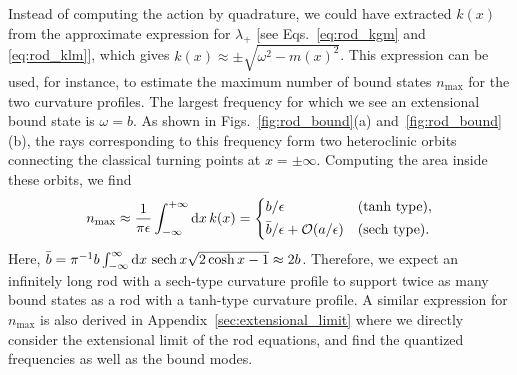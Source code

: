 Instead of computing the action by quadrature, we could have extracted $k(x)$ from the approximate expression for $\lambda_{+}$ [see Eqs.~\eqref{eq:rod_kgm} and \eqref{eq:rod_klm}], which gives $k(x) \approx \pm\sqrt{\omega^{2} - m(x)^{2}}$.
This expression can be used, for instance, to estimate the maximum number of bound states $n_{\text{max}}$ for the two curvature profiles.
The largest frequency for which we see an extensional bound state is $\omega = b$.
As shown in Figs.~\ref{fig:rod_bound}(a) and~\ref{fig:rod_bound}(b), the rays corresponding to this frequency form two heteroclinic orbits connecting the classical turning points at $x = \pm \infty$.
Computing the area inside these orbits, we find
%
\begin{equation}
  n_{\text{max}} \approx \frac{1}{\pi\epsilon}\int_{-\infty}^{+\infty} \mathrm{d}{x}\,k(x) =
  \begin{dcases}
    b/\epsilon & \text{(tanh type)},\\
    \bar{b}/\epsilon + \mathcal{O}(a/\epsilon) & \text{(sech type)}.
  \end{dcases}
  \label{eq:rod_maxb}
\end{equation}
%
Here, $\bar{b} = \pi^{-1}b\int_{-\infty}^{\infty}\mathrm{d}{x}\,\operatorname{sech}{x}\sqrt{2\cosh{x} - 1} \approx 2b$.
Therefore, we expect an infinitely long rod with a sech-type curvature profile to support twice as many bound states as a rod with a tanh-type curvature profile.
A similar expression for $n_\text{max}$ is also derived in Appendix~\ref{sec:extensional_limit} where we directly consider the extensional limit of the rod equations, and find the quantized frequencies as well as the bound modes.

